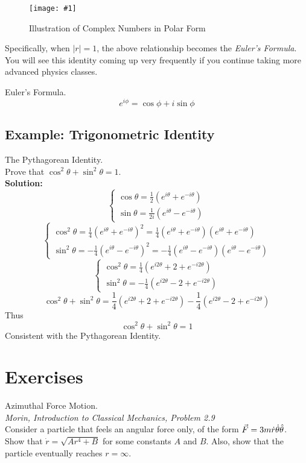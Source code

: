 \documentclass[11pt]{article}
\newcommand{\fig}[4]{
    \begin{figure}[H]
        \centering
        \texttt{[image: \#1]}
        \caption{#2}
        \label{exp4fit}
    \end{figure}
}
\theoremstyle{gangnamstyle}{\newtheorem{definition}{Definition}[]}
\theoremstyle{gangnamstyle}{\newtheorem{example}{Example}[]}
\theoremstyle{gangnamstyle}{\newtheorem{problem}{Problem}[]}
\begin{document}
\fig{figs/n0/complex.jpeg}{Illustration of Complex Numbers in Polar Form}{0.1}{0}

Specifically, when $|r| = 1$, the above relationship becomes the \textit{Euler's Formula}. You will see this identity coming up very frequently if you continue taking more advanced physics classes. 
\begin{definition}
Euler's Formula. \\
\begin{equation}
e^{i\phi} = \cos\phi + i\sin\phi
\end{equation}
\end{definition}

\subsection{Example: Trigonometric Identity}
\begin{example}
The Pythagorean Identity. \\
Prove that $\cos^2\theta + \sin^2\theta = 1$. \\

\textbf{Solution:} 
\[ \begin{cases}
\cos\theta = \frac{1}{2}(e^{i\theta} + e^{-i\theta}) \\
\sin\theta = \frac{1}{2i}(e^{i\theta} - e^{-i\theta})
\end{cases} \]
\[ \begin{cases}
\cos^2\theta = \frac{1}{4}(e^{i\theta} + e^{-i\theta})^2 = \frac{1}{4}(e^{i\theta} + e^{-i\theta})(e^{i\theta} + e^{-i\theta}) \\
\sin^2\theta = -\frac{1}{4}(e^{i\theta} - e^{-i\theta})^2 = -\frac{1}{4}(e^{i\theta} - e^{-i\theta})(e^{i\theta} - e^{-i\theta})
\end{cases} \]
\[ \begin{cases}
\cos^2\theta = \frac{1}{4}(e^{i2\theta} + 2 + e^{-i2\theta}) \\
\sin^2\theta = -\frac{1}{4}(e^{i2\theta} - 2 + e^{-i2\theta})
\end{cases} \]
\[ \cos^2\theta + \sin^2\theta = \frac{1}{4}(e^{i2\theta} + 2 + e^{-i2\theta}) -\frac{1}{4}(e^{i2\theta} - 2 + e^{-i2\theta}) \]
Thus
\[ \cos^2\theta + \sin^2\theta = 1 \]
Consistent with the Pythagorean Identity.
\end{example}

\pagebreak

\section{Exercises}
\begin{problem}
Azimuthal Force Motion. \\
\textit{Morin, Introduction to Classical Mechanics, Problem 2.9} \\
Consider a particle that feels an angular force only, of the form $\Vec{F} = 3m\Dot{r}\Dot{\theta}\Hat{\theta}$. Show that $\Dot{r} = \sqrt{Ar^4 + B}$ for some constants $A$ and $B$. Also, show that the particle eventually reaches $r = \infty$. 
\end{problem}
\end{document}
